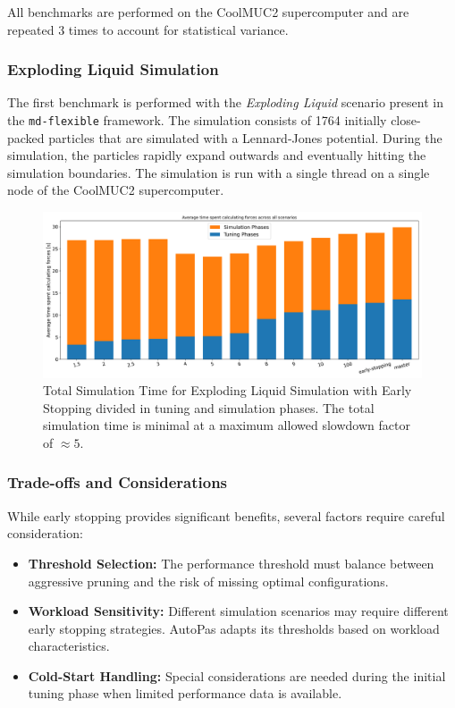 \documentclass[conference]{IEEEtran}
\begin{document}
All benchmarks are performed on the CoolMUC2 supercomputer  and are repeated 3 times to account for statistical variance.

\subsubsection{Exploding Liquid Simulation}

The first benchmark is performed with the \textit{Exploding Liquid} scenario present in the \texttt{md-flexible} framework. The simulation consists of 1764 initially close-packed particles that are simulated with a Lennard-Jones potential. During the simulation, the particles rapidly expand outwards and eventually hitting the simulation boundaries. The simulation is run with a single thread on a single node of the CoolMUC2 supercomputer.

\begin{figure}[H]
    \centering

    \includegraphics[width=\columnwidth]{../data/explodingLiquid/analytics/total_time_average.png}

    \caption{Total Simulation Time for Exploding Liquid Simulation with Early Stopping divided in tuning and simulation phases. The total simulation time is minimal at a maximum allowed slowdown factor of $\approx5$.}
\end{figure}


\subsubsection{Trade-offs and Considerations}
While early stopping provides significant benefits, several factors require careful consideration:

\begin{itemize}
    \item \textbf{Threshold Selection:} The performance threshold must balance between aggressive pruning and the risk of missing optimal configurations.

    \item \textbf{Workload Sensitivity:} Different simulation scenarios may require different early stopping strategies. AutoPas adapts its thresholds based on workload characteristics.

    \item \textbf{Cold-Start Handling:} Special considerations are needed during the initial tuning phase when limited performance data is available.
\end{itemize}
\end{document}
